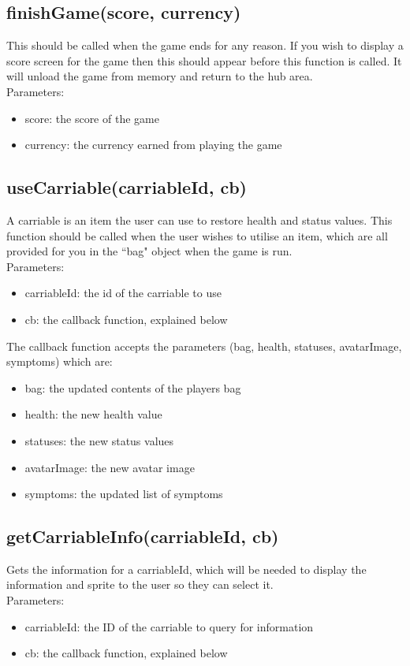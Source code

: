 \documentclass[a4paper,12pt]{article}
\begin{document}
\subsection*{finishGame(score, currency)}
This should be called when the game ends for any reason. If you wish to display a score screen for the game then
this should appear before this function is called. It will unload the game from memory and return to the hub area.\\
Parameters:
\begin{itemize}
	\setlength\itemsep{0em}
	\item score: the score of the game
	\item currency: the currency earned from playing the game
\end{itemize}

\newpage

\subsection*{useCarriable(carriableId, cb)}
A carriable is an item the user can use to restore health and status values. This function should be called when the
user wishes to utilise an item, which are all provided for you in the ``bag" object when the game is run.\\
Parameters:
\begin{itemize}
	\setlength\itemsep{0em}
	\item carriableId: the id of the carriable to use
	\item cb: the callback function, explained below
\end{itemize}

The callback function accepts the parameters (bag, health, statuses, avatarImage, symptoms) which are:
\begin{itemize}
	\setlength\itemsep{0em}
	\item bag: the updated contents of the players bag
	\item health: the new health value
	\item statuses: the new status values
	\item avatarImage: the new avatar image
	\item symptoms: the updated list of symptoms
\end{itemize}

\subsection*{getCarriableInfo(carriableId, cb)}
Gets the information for a carriableId, which will be needed to display the information and sprite to the user
so they can select it.\\
Parameters:
\begin{itemize}
	\setlength\itemsep{0em}
	\item carriableId: the ID of the carriable to query for information
	\item cb: the callback function, explained below
\end{itemize}
\end{document}
